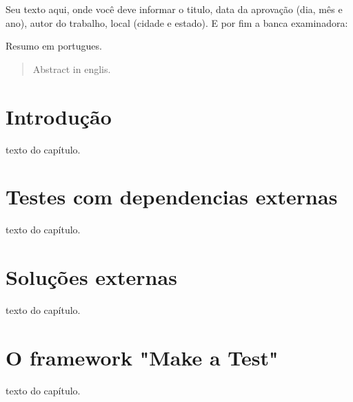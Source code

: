 \documentclass{abnt}
\begin{document}
\capa
\folhaderosto

\setlength{\ABNTsignthickness}{1pt}
\begin{folhadeaprovacao}
	Seu texto aqui, onde você deve informar o titulo, data da aprovação (dia, mês e ano), autor do trabalho, local (cidade e estado). E por fim a banca examinadora:
\end{folhadeaprovacao}

\begin{resumo}
	Resumo em portugues.
\end{resumo}

\begin{abstract}
	Abstract in englis.
\end{abstract}

\sumario

\chapter{Introdução} 
texto do capítulo.

\chapter{Testes com dependencias externas} 
texto do capítulo.

\chapter{Soluções externas} 
texto do capítulo.

\chapter{O framework "Make a Test"} 
texto do capítulo. \cite{apache-synapse}


\end{document}
